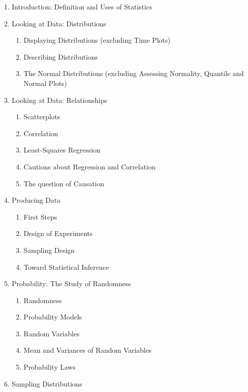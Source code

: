\documentclass[10pt]{article}
\begin{document}
{\small\setlength{\baselineskip}{0.97\baselineskip}
 \begin{enumerate}
\item Introduction: Definition and Uses of Statistics
\item Looking at Data: Distributions
   \begin{enumerate}
                  \item Displaying Distributions (excluding Time Plots)
                  \item Describing Distributions
                  \item The Normal Distributions (excluding Assessing Normality, Quantile and Normal Plots)
   \end{enumerate}
\item Looking at Data: Relationships
   \begin{enumerate}
                  \item Scatterplots
                  \item Correlation
                  \item Least-Squares Regression
                  \item Cautions about Regression and Correlation
                  \item The question of Causation
   \end{enumerate}
\item Producing Data
   \begin{enumerate}
                  \item First Steps
                  \item Design of Experiments
                  \item Sampling Design
                  \item Toward Statistical Inference
   \end{enumerate}
\item Probability: The Study of Randomness
   \begin{enumerate}
                  \item Randomness
                  \item Probability Models
                  \item Random Variables
                  \item Mean and Variances of Random Variables
                  \item Probability Laws
   \end{enumerate}
\item Sampling Distributions
   \begin{enumerate}

\end{enumerate}
\end{enumerate}}
\end{document}
